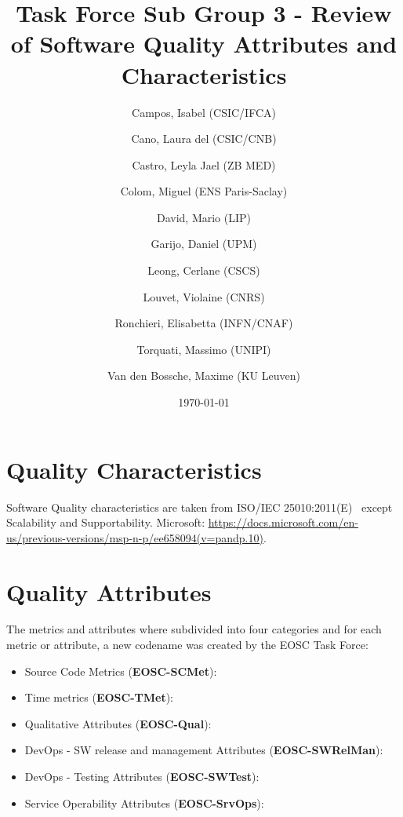 \documentclass[a4paper]{article}
\title{Task Force Sub Group 3 - Review of Software Quality Attributes and Characteristics}
\author{
    Campos, Isabel (CSIC/IFCA) \and
    Cano, Laura del (CSIC/CNB) \and
    Castro, Leyla Jael (ZB MED) \and
    Colom, Miguel (ENS Paris-Saclay) \and
    David, Mario (LIP) \and
    Garijo, Daniel (UPM) \and
    Leong, Cerlane (CSCS) \and
    Louvet, Violaine (CNRS) \and
    Ronchieri, Elisabetta (INFN/CNAF) \and
    Torquati, Massimo (UNIPI) \and
    Van den Bossche, Maxime (KU Leuven)
    }
\date{\today}
\begin{document}
\maketitle
\tableofcontents

\newpage
\section{Quality Characteristics}

Software Quality characteristics are taken from ISO/IEC 25010:2011(E)~\cite{iso_25010_2011_2017} except Scalability and Supportability.
Microsoft: \url{https://docs.microsoft.com/en-us/previous-versions/msp-n-p/ee658094(v=pandp.10)}.



\newpage
\section{Quality Attributes}

The metrics and attributes where subdivided into four categories and for each metric or attribute,
a new codename was created by the EOSC Task Force:

\begin{itemize}
    \item Source Code Metrics (\textbf{EOSC-SCMet}):
    \item Time metrics (\textbf{EOSC-TMet}):
    \item Qualitative Attributes (\textbf{EOSC-Qual}):
    \item DevOps - SW release and management Attributes (\textbf{EOSC-SWRelMan}):
    \item DevOps - Testing Attributes (\textbf{EOSC-SWTest}):
    \item Service Operability Attributes (\textbf{EOSC-SrvOps}):
\end{itemize}



\newpage
\printbibliography
\end{document}

